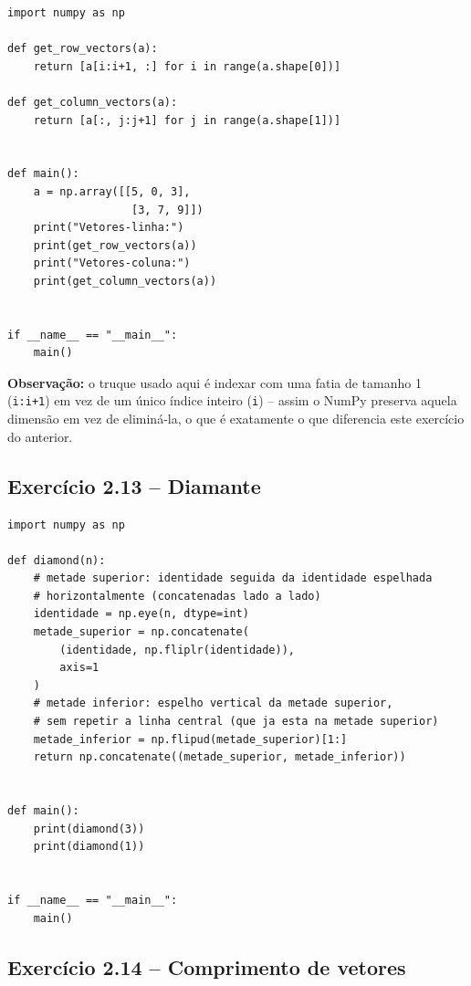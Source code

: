 \documentclass[11pt,a4paper]{article}
\begin{document}
\begin{solucao}
\begin{lstlisting}
import numpy as np

def get_row_vectors(a):
    return [a[i:i+1, :] for i in range(a.shape[0])]

def get_column_vectors(a):
    return [a[:, j:j+1] for j in range(a.shape[1])]


def main():
    a = np.array([[5, 0, 3],
                   [3, 7, 9]])
    print("Vetores-linha:")
    print(get_row_vectors(a))
    print("Vetores-coluna:")
    print(get_column_vectors(a))


if __name__ == "__main__":
    main()
\end{lstlisting}

\textbf{Observação:} o truque usado aqui é indexar com uma fatia de tamanho 1 (\texttt{i:i+1}) em vez de um único índice inteiro (\texttt{i}) -- assim o NumPy preserva aquela dimensão em vez de eliminá-la, o que é exatamente o que diferencia este exercício do anterior.
\end{solucao}

\subsection*{Exercício 2.13 -- Diamante}

\begin{solucao}
\begin{lstlisting}
import numpy as np

def diamond(n):
    # metade superior: identidade seguida da identidade espelhada
    # horizontalmente (concatenadas lado a lado)
    identidade = np.eye(n, dtype=int)
    metade_superior = np.concatenate(
        (identidade, np.fliplr(identidade)),
        axis=1
    )
    # metade inferior: espelho vertical da metade superior,
    # sem repetir a linha central (que ja esta na metade superior)
    metade_inferior = np.flipud(metade_superior)[1:]
    return np.concatenate((metade_superior, metade_inferior))


def main():
    print(diamond(3))
    print(diamond(1))


if __name__ == "__main__":
    main()
\end{lstlisting}
\end{solucao}

\subsection*{Exercício 2.14 -- Comprimento de vetores}
\end{document}
